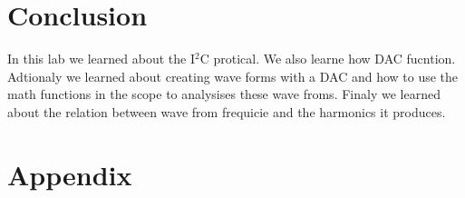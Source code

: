 \documentclass[prl,12pt,notitlepage,aps,onecolumn,superscriptaddress]{revtex4-1}
\begin{document}
\section{Conclusion}
In this lab we learned about the I$^2$C protical. We also learne how DAC fucntion. Adtionaly we learned about creating wave forms with a DAC and how to use the math functions in the scope to analysises these wave froms. Finaly we learned about the relation between wave from frequicie and the harmonics it produces. 

\section{Appendix}




\end{document}
